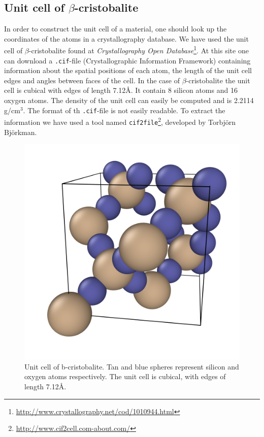 \documentclass[twoside,english]{uiofysmaster}
\begin{document}
\subsection{Unit cell of $\beta$-cristobalite}
In order to construct the unit cell of a material, one should look up the coordinates of the atoms in a crystallography database. We have used the unit cell of $\beta$-cristobalite found at \textit{Crystallography Open Database}\footnote{\href{http://www.crystallography.net/cod/1010944.html}{http://www.crystallography.net/cod/1010944.html}}. 
At this site one can download a \texttt{.cif}-file (Crystallographic Information Framework) containing information about the spatial positions of each atom, the length of the unit cell edges and angles between faces of the cell. 
In the case of $\beta$-cristobalite the unit cell is cubical with edges of length 7.12Å. 
It contain 8 silicon atoms and 16 oxygen atoms. 
The density of the unit cell can easily be computed and is 2.2114 g/cm$^3$.
The format of th \texttt{.cif}-file is not easily readable. To extract the information we have used a tool named \texttt{cif2file}\footnote{\href{http://www.cif2cell.com-about.com/}{http://www.cif2cell.com-about.com/}}, developed by Torbjörn Björkman. 

\begin{figure}
	\centering
	\includegraphics[width=0.6\linewidth]{figures/unitcell/unitcell.png}
	\caption{Unit cell of b-cristobalite. Tan and blue spheres represent silicon and oxygen atoms respectively. The unit cell is cubical, with edges of length 7.12Å.}
	\label{fig:unitcellbcristobalite}
\end{figure}
\end{document}
